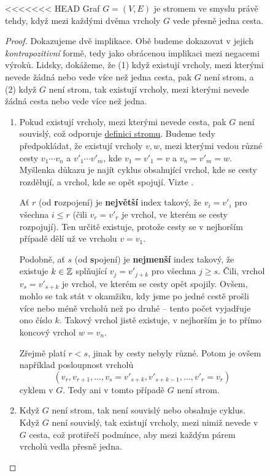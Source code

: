 \begin{figure}[h]
\begin{claim}
<<<<<<< HEAD
	\label{claim:ekvivalentni-definice-stromu}
	Graf $G = (V,E)$ je stromem ve smyslu  právě tehdy,
	když mezi každými dvěma vrcholy $G$ vede přesně jedna cesta.
\end{claim}

\begin{proof}
	Dokazujeme dvě implikace. Obě budeme dokazovat v jejich \emph{kontrapozitivní}
	formě, tedy jako obrácenou implikaci mezi negacemi výroků. Lidsky, dokážeme, že
	(1) když existují vrcholy, mezi kterými nevede žádná nebo vede více než jedna
	cesta, pak $G$ není strom, a (2) když $G$ není strom, tak existují vrcholy,
	mezi kterými nevede žádná cesta nebo vede více než jedna.
	\begin{enumerate}
		\item Pokud existují vrcholy, mezi kterými nevede cesta, pak $G$ není
		      souvislý, což odporuje \hyperref[def:strom]{definici stromu}. Budeme tedy
		      předpokládat, že existují vrcholy $v,w$, mezi kterými vedou různé cesty $v_1
			      \cdots v_n$ a $v'_1 \cdots v'_m$, kde $v_1 = v'_1 = v$ a $v_n = v'_m = w$.
		      Myšlenka důkazu je najít cyklus obsahující vrchol, kde se cesty rozdělují, a
		      vrchol, kde se opět spojují. Vizte
		      .

		      Ať $r$ (od \textbf{r}ozpojení) je \textbf{největší} index takový, že $v_i =
			      v'_i$ pro všechna $i \leq r$ (čili $v_r = v'_r$ je vrchol, ve kterém se cesty
		      rozpojují). Ten určitě existuje, protože cesty se v nejhorším případě dělí už
		      ve vrcholu $v = v_1$.

		      Podobně, ať $s$ (od \textbf{s}pojení) je \textbf{nejmenší} index takový, že
		      existuje $k \in \mathbb{Z}$ splňující $v_j = v'_{j+k}$ pro všechna $j \geq s$. Čili,
		      vrchol $v_s = v'_{s+k}$ je vrchol, ve kterém se cesty opět spojily. Ovšem,
		      mohlo se tak stát v okamžiku, kdy jsme po jedné cestě prošli více nebo méně
		      vrcholů než po druhé -- tento počet vyjadřuje ono číslo $k$. Takový vrchol
		      jistě existuje, v nejhorším je to přímo koncový vrchol $w = v_n$.

		      Zřejmě platí $r < s$, jinak by cesty nebyly různé. Potom je ovšem například
		      posloupnost vrcholů
		      \[
			      (v_r,v_{r+1},\ldots,v_s = v'_{s+k},v'_{s+k-1},\ldots,v'_r = v_r)
		      \]
		      cyklem v $G$. Tedy ani v tomto případě $G$ není strom.
		\item Když $G$ není strom, tak není souvislý nebo obsahuje cyklus. Když $G$
		      není souvislý, tak existují vrcholy, mezi nimiž nevede v $G$ cesta, což
		      protiřečí podmínce, aby mezi každým párem vrcholů vedla přesně jedna.


\end{enumerate}
\end{proof}
\end{figure}
